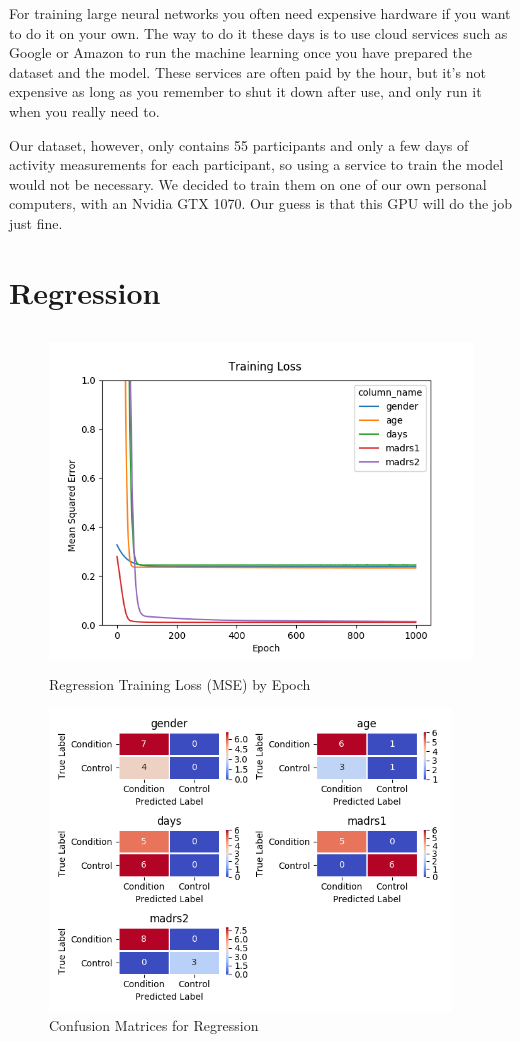 For training large neural networks you often need expensive hardware if you want to do it on your own. 
The way to do it these days is to use cloud services such as Google or Amazon to run the machine learning once you have prepared the dataset and the model. 
These services are often paid by the hour, but it's not expensive as long as you remember to shut it down after use, and only run it when you really need to.

Our dataset, however, only contains 55 participants and only a few days of activity measurements for each participant, 
so using a service to train the model would not be necessary. We decided to train them on one of our own personal computers, 
with an Nvidia GTX 1070. Our guess is that this GPU will do the job just fine. 
 
\section{Regression}

\begin{figure}
      \includegraphics[height=9cm]{img/regression/results_kerasregressor_1k_epochs.png}
      \caption{Regression Training Loss (MSE) by Epoch}
      \label{figure:regression_training_loss}
\end{figure}

\begin{figure}
      \includegraphics[height=8cm]{img/regression/confusion_kerasregressor_grouped.png}
      \caption{Confusion Matrices for Regression}
      \label{figure:regression_test_confusion}
\end{figure}

